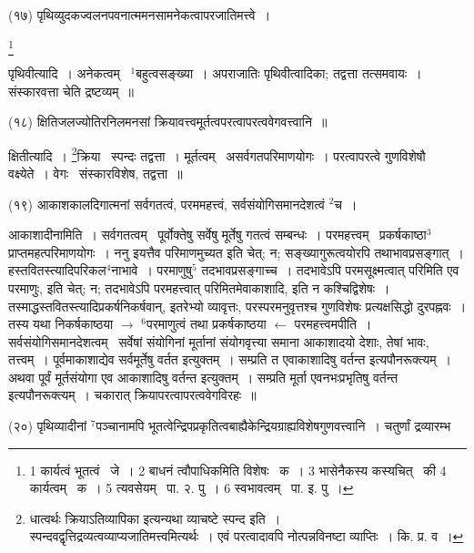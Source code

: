 \documentclass[11pt, openany]{book}
\newcommand\blfootnote[1]{%
 \begingroup
 \renewcommand\thefootnote{}\footnote{#1}%
 \addtocounter{footnote}{-1}%
 \endgroup
}
\begin{document}
\hangindent=2cm {\knu (१७) पृथिव्युदकज्वलनपवनात्ममनसामनेकत्वापरजातिमत्त्वे~।}

\blfootnote{1 कार्यत्वं भूतत्वं  \textendash\ जे~। 2 बाधनं त्वौपाधिकमिति विशेषः  \textendash\ क~। 3 भासेनैकस्य कस्यचित्  \textendash\ की 4 कार्यत्वम्  \textendash\ क~। 5 त्यवसेयम्  \textendash\ पा. २. पु~। 6 स्वभावत्वम्  \textendash\ पा. इ. पु~।}

\newpage
\noindent
{\knu पृथिवीत्यादि~। अनेकत्वम्} \textendash\ ${}^1$बहुत्वसङ्ख्या~। अपराजातिः पृथिवीत्वादिका; तद्वत्ता तत्समवायः~। संस्कारवत्ता चेति द्रष्टव्यम्~॥

\hangindent=2cm {\knu (१८) क्षितिजलज्योतिरनिलमनसां क्रियावत्त्वमूर्तत्वपरत्वापरत्ववेगवत्त्वानि~॥}

{\knu क्षिती}त्यादि~। \renewcommand{\thefootnote}{१}\footnote{धात्वर्थः क्रियाऽतिव्यापिका इत्यन्यथा व्याचष्टे स्पन्द इति~। स्पन्दवद्वृत्तिद्रव्यत्वव्याप्यजातिमत्त्वमित्यर्थः~। एवं परत्वादावपि नोत्पन्नविनष्टा व्याप्तिः~। कि. प्र. व~।}क्रिया \textendash\ स्पन्दः तद्वत्ता~। {\knu मूर्तत्वम्} \textendash\ असर्वगतपरिमाणयोगः~। {\knu परत्वापरत्वे} गुणविशेषौ वक्ष्येते~। {\knu वेगः} \textendash\ संस्कारविशेष, तद्वत्ता~॥

\hangindent=2cm {\knu (१९) आकाशकालदिगात्मनां सर्वगतत्वं, परममहत्त्वं, सर्वसंयोगिसमानदेशत्वं ${}^2$च~।}

{\knu आकाशादीना}मिति~। {\knu सर्वगतत्वम्} \textendash\ पूर्वोक्तेषु सर्वेषु मूर्तेषु गतत्वं सम्बन्धः~। परमहत्त्वम् \textendash\ प्रकर्षकाष्ठा$^3$प्राप्तमहत्परिमाणयोगः~। ननु इयत्तैव परिमाणमुच्यत इति चेत्; न; सङ्ख्यागुरूत्वयोरपि तथाभावप्रसङ्गात्~। हस्तवितस्त्यादिपरिकल$^4$नाभावे~। परमाणुषु$^5$ तदभावप्रसङ्गाच्च~। तदभावेऽपि परमसूक्ष्मत्वात् परिमिति एव परमाणुः, इति चेत्; न; तदभावेऽपि परमहत्त्वात् परिमितमेवाकाशादि, इति न कश्चिद्विशेषः~। तस्माद्धस्तवितस्त्यादिप्रकर्षनिकर्षवान्, इतरेभ्यो व्यावृत्तः, परस्परमनुवृत्तश्च गुणविशेषः प्रत्यक्षसिद्धो दुरपह्नवः~। तस्य यथा निकर्षकाष्ठया $\rightarrow$ ${}^6$परमाणुत्वं तथा प्रकर्षकाष्ठया $\leftarrow$ परमहत्त्वमपीति~। {\knu सर्वसंयोगिसमानदेशत्वम्} \textendash\ सर्वेषां संयोगिनां मूर्तानां संयोगवृत्त्या समाना आकाशादयो देशाः, तेषां भावः, तत्त्वम्~। पूर्वमाकाशाद्येव सर्वमूर्तेषु वर्तत इत्युक्तम्~। सम्प्रति त एवाकाशादिषु वर्तन्त इत्यपौनरूक्त्यम्~। अथवा पूर्वं मूर्तसंयोगा एव आकाशादिषु वर्तन्त इत्युक्तम्~। सम्प्रति मूर्ता एवनभःप्रभृतिषु वर्तन्त इत्यपौनरूक्त्यम्~। चकारात् क्रियापरत्वापरत्ववेगविरहः~॥

\hangindent=2cm {\knu (२०) पृथिव्यादीनां ${}^7$पञ्चानामपि भूतत्वेन्द्रिपप्रकृतित्वबाह्यैकेन्द्रियग्राह्यविशेषगुणवत्त्वानि~। चतुर्णां द्रव्यारम्भ \textendash\ }
\end{document}
